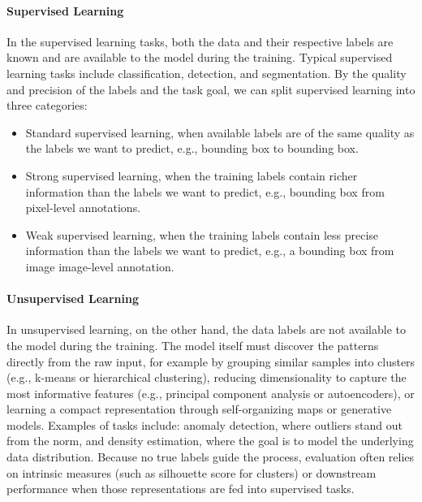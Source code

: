 \paragraph{Supervised Learning} In the supervised learning tasks, both the data and their respective labels are known and are available to the model during the training. Typical supervised learning tasks include classification, detection, and segmentation. By the quality and precision of the labels and the task goal, we can split supervised learning into three categories:

\begin{itemize}
    \item Standard supervised learning, when available labels are of the same quality as the labels we want to predict, e.g., bounding box to bounding box.
    \item Strong supervised learning, when the training labels contain richer information than the labels we want to predict, e.g., bounding box from pixel-level annotations.
    \item Weak supervised learning, when the training labels contain less precise information than the labels we want to predict, e.g., a bounding box from image image-level annotation.
\end{itemize}

\paragraph{Unsupervised Learning} 
In unsupervised learning, on the other hand, the data labels are not available to the model during the training. The model itself must discover the patterns directly from the raw input, for example by grouping similar samples into clusters (e.g., k-means or hierarchical clustering), reducing dimensionality to capture the most informative features (e.g., principal component analysis or autoencoders), or learning a compact representation through self-organizing maps or generative models. Examples of tasks include: anomaly detection, where outliers stand out from the norm, and density estimation, where the goal is to model the underlying data distribution. Because no true labels guide the process, evaluation often relies on intrinsic measures (such as silhouette score for clusters) or downstream performance when those representations are fed into supervised tasks.


